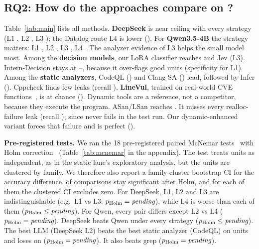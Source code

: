 

\subsection{RQ2: How do the approaches compare on \Deb?}\label{sec:rq2}

Table~\ref{tab:main} lists all methods.
\textbf{DeepSeek} is near ceiling with every strategy
(L1 , L2 , L3 );
the Datalog route L4 is lower ().
For \textbf{Qwen3.5-4B} the strategy matters:
L1 , L2 , L3 , L4 .
The analyzer evidence of L3 helps the small model most.
Among the \textbf{decision models}, our LoRA classifier reaches  and Jev  (L3).
Intern-Decision stays at --,
because it over-flags good units (specificity  for L1).
Among the \textbf{static analyzers}, CodeQL () and Clang SA () lead,
followed by Infer ().
Cppcheck finds few leaks (recall ).
\textbf{LineVul}, trained on real-world CVE functions~\cite{fu2022linevul}, is at chance ().
Dynamic tools are a reference, not a competitor, because they execute the program.
ASan/LSan reaches .
It misses every realloc-failure leak (recall ),
since  never fails in the test run.
Our dynamic-enhanced variant forces that failure and is perfect ().

\textbf{Pre-registered tests.}
We ran the 18 pre-registered paired McNemar tests~\cite{mcnemar1947} with Holm correction~\cite{holm1979}
(Table~\ref{tab:mcnemar} in the appendix).
The test treats units as independent, as in the static lane's exploratory analysis, but the units are clustered by family.
We therefore also report a family-cluster bootstrap CI for the accuracy difference.
 of  comparisons stay significant after Holm,
and for each of them the clustered CI excludes zero.
For DeepSeek, L1, L2 and L3 are indistinguishable
(e.g.\ L1 vs L3: $p_{\mathrm{Holm}}=\res{x}{mcdeepseekL1vsdeepseekL3_holm}$),
while L4 is worse than each of them ($p_{\mathrm{Holm}}\le\res{x}{mcdeepseekL3vsdeepseekL4_holm}$).
For Qwen, every pair differs except L2 vs L4 ($p_{\mathrm{Holm}}=\res{x}{mcqwenL2vsqwenL4_holm}$).
DeepSeek beats Qwen under every strategy ($p_{\mathrm{Holm}}\le\res{x}{mcdeepseekL3vsqwenL3_holm}$).
The best LLM (DeepSeek L2) beats the best static analyzer (CodeQL) on
 units and loses on 
($p_{\mathrm{Holm}}=\res{x}{mcdeepseekL2vscodeql_holm}$).
It also beats grep ($p_{\mathrm{Holm}}=\res{x}{mcdeepseekL2vsgrep_holm}$).

